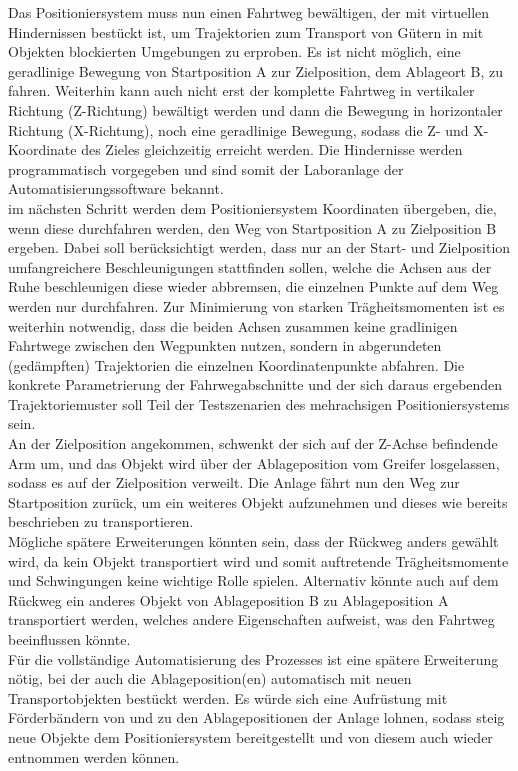 \documentclass[../Bachelorarbeit.tex]{subfiles}
\begin{document}
Das Positioniersystem muss nun einen Fahrtweg bewältigen, der mit virtuellen Hindernissen bestückt ist, um Trajektorien zum Transport von Gütern in mit Objekten blockierten Umgebungen zu erproben. Es ist nicht möglich, eine geradlinige Bewegung von Startposition A zur Zielposition, dem Ablageort B, zu fahren. Weiterhin kann auch nicht erst der komplette Fahrtweg in vertikaler Richtung (Z-Richtung) bewältigt werden und dann die Bewegung in horizontaler Richtung (X-Richtung), noch eine geradlinige Bewegung, sodass die Z- und X-Koordinate des Zieles gleichzeitig erreicht werden. Die Hindernisse werden programmatisch vorgegeben und sind somit der Laboranlage \bzw der Automatisierungssoftware bekannt.\\
im nächsten Schritt werden dem Positioniersystem Koordinaten übergeben, die, wenn diese durchfahren werden, den Weg von Startposition A zu Zielposition B ergeben. Dabei soll berücksichtigt werden, dass nur an der Start- und Zielposition umfangreichere Beschleunigungen stattfinden sollen, welche die Achsen aus der Ruhe beschleunigen \bzw diese wieder abbremsen, die einzelnen Punkte auf dem Weg werden nur durchfahren. Zur Minimierung von starken Trägheitsmomenten ist es weiterhin notwendig, dass die beiden Achsen zusammen keine gradlinigen Fahrtwege zwischen den Wegpunkten nutzen, sondern in abgerundeten (gedämpften) Trajektorien die einzelnen Koordinatenpunkte abfahren. Die konkrete Parametrierung der Fahrwegabschnitte und der sich daraus ergebenden Trajektoriemuster soll Teil der Testszenarien des mehrachsigen Positioniersystems sein.\\
An der Zielposition angekommen, schwenkt der sich auf der Z-Achse befindende Arm um, und das Objekt wird über der Ablageposition vom Greifer losgelassen, sodass es auf der Zielposition verweilt. Die Anlage fährt nun den Weg zur Startposition zurück, um ein weiteres Objekt aufzunehmen und dieses wie bereits beschrieben zu transportieren.\\
Mögliche spätere Erweiterungen könnten sein, dass der Rückweg anders gewählt wird, da kein Objekt transportiert wird und somit auftretende Trägheitsmomente und Schwingungen keine wichtige Rolle spielen. Alternativ könnte auch auf dem Rückweg ein anderes Objekt von Ablageposition B zu Ablageposition A transportiert werden, welches andere Eigenschaften aufweist, was den Fahrtweg beeinflussen könnte.\\
Für die vollständige Automatisierung des Prozesses ist eine spätere Erweiterung nötig, bei der auch die Ablageposition(en) automatisch mit neuen Transportobjekten bestückt werden. Es würde sich eine Aufrüstung mit Förderbändern von und zu den Ablagepositionen der Anlage lohnen, sodass steig neue Objekte dem Positioniersystem bereitgestellt und von diesem auch wieder entnommen werden können.\\
\end{document}
